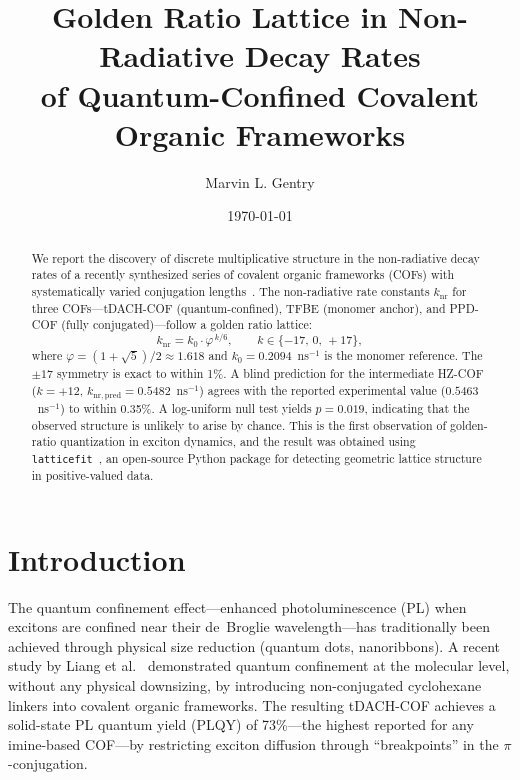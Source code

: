 \documentclass[11pt,a4paper]{article}
\begin{document}
\title{Golden Ratio Lattice in Non-Radiative Decay Rates\\
       of Quantum-Confined Covalent Organic Frameworks}

\author{Marvin L. Gentry}
\date{\today}

\maketitle

\begin{abstract}
We report the discovery of discrete multiplicative structure in the
non-radiative decay rates of a recently synthesized series of covalent
organic frameworks (COFs) with systematically varied conjugation
lengths~\cite{Liang2025}. The non-radiative rate constants
$k_{\mathrm{nr}}$ for three COFs---tDACH-COF (quantum-confined),
TFBE (monomer anchor), and PPD-COF (fully conjugated)---follow a
golden ratio lattice:
\[
k_{\mathrm{nr}} = k_0 \cdot \varphi^{\,k/6}, \qquad k \in \{-17,\, 0,\, +17\},
\]
where $\varphi = (1+\sqrt{5})/2 \approx 1.618$ and
$k_0 = 0.2094$~ns$^{-1}$ is the monomer reference.
The $\pm 17$ symmetry is exact to within 1\%.
A blind prediction for the intermediate HZ-COF ($k = +12$,
$k_{\mathrm{nr,pred}} = 0.5482$~ns$^{-1}$) agrees with the reported
experimental value ($0.5463$~ns$^{-1}$) to within 0.35\%.
A log-uniform null test yields $p = 0.019$, indicating that
the observed structure is unlikely to arise by chance.
This is the first observation of golden-ratio quantization in
exciton dynamics, and the result was obtained using
\texttt{latticefit}~\cite{Gentry:LatticeFit}, an open-source
Python package for detecting geometric lattice structure in
positive-valued data.
\end{abstract}

\section{Introduction}

The quantum confinement effect---enhanced photoluminescence (PL)
when excitons are confined near their de~Broglie wavelength---has
traditionally been achieved through physical size reduction (quantum
dots, nanoribbons). A recent study by Liang et al.~\cite{Liang2025}
demonstrated quantum confinement at the molecular level, without any
physical downsizing, by introducing non-conjugated cyclohexane linkers
into covalent organic frameworks. The resulting tDACH-COF achieves
a solid-state PL quantum yield (PLQY) of 73\%---the highest reported
for any imine-based COF---by restricting exciton diffusion through
``breakpoints'' in the $\pi$-conjugation.
\end{document}
